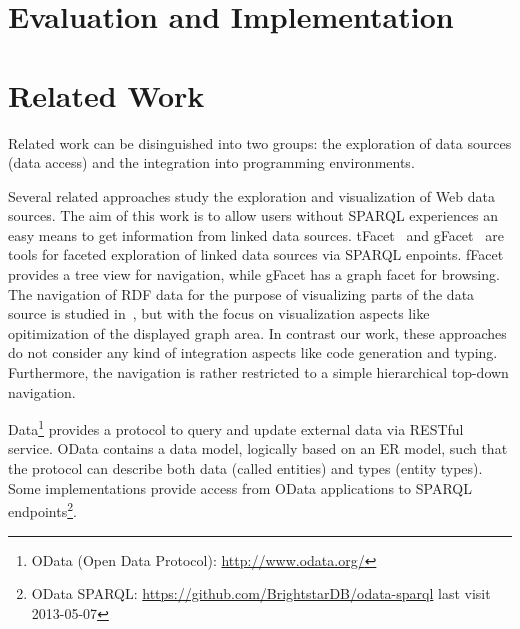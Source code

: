 \documentclass{llncs} %
\begin{document}
\section{Evaluation and Implementation}
\label{sec:eval}


 
\section{Related Work}
\label{sec:rw}

Related work can be disinguished into two groups: the exploration of data sources (data access)
and the integration into programming environments.

Several related approaches study the exploration and visualization of Web data sources. 
The aim of this work is to allow users without SPARQL experiences an easy means to
get information from linked data sources.
tFacet~\cite{tFacet} and gFacet~\cite{heim2008gfacet} are tools for faceted exploration of linked data sources
via SPARQL enpoints. fFacet provides a tree view for navigation, while gFacet has a graph facet for browsing.
The navigation of RDF data for the purpose of visualizing parts of the data source is studied in~\cite{DBLP:conf/iv/DokulilK08},
but with the focus on visualization aspects like opitimization of the displayed graph area.
In contrast our work, these approaches do not consider any kind of integration aspects like code generation and typing.
Furthermore, the navigation is rather restricted to a simple hierarchical top-down navigation.

Data\footnote{OData (Open Data Protocol): \url{http://www.odata.org/}}  provides a protocol to query and update external data via RESTful service.
OData contains a data model, logically based on an ER model, such that the protocol can describe both data (called entities) and types (entity types).
Some implementations provide access from OData applications to SPARQL endpoints\footnote{OData SPARQL: \url{https://github.com/BrightstarDB/odata-sparql} last visit 2013-05-07}.



 
\end{document}
